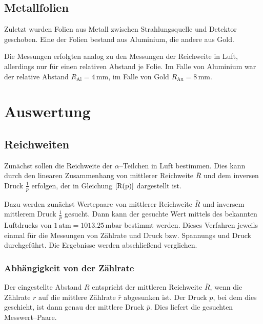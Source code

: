 \documentclass[12pt,a4paper]{scrartcl}
\numberwithin{equation}{section} %
\begin{document}
\hypertarget{metallfolien}{%
\subsection{Metallfolien}\label{metallfolien}}

Zuletzt wurden Folien aus Metall zwischen Strahlungsquelle und Detektor geschoben. Eine der Folien bestand aus Aluminium, die andere aus Gold.

Die Messungen erfolgten analog zu den Messungen der Reichweite in Luft, allerdings nur für einen relativen Abstand je Folie. Im Falle von Aluminium war der relative Abstand $R_\mathrm{Al}=4\mathrm{\,mm}$, im Falle von Gold $R_\mathrm{Au}=8\mathrm{\,mm}$.

\hypertarget{auswertung}{%
\section{Auswertung}\label{auswertung}}

\hypertarget{reichweiten}{%
\subsection{Reichweiten}\label{reichweiten}}

Zunächst sollen die Reichweite der $\alpha$--Teilchen in Luft bestimmen. Dies kann durch den linearen Zusammenhang von mittlerer Reichweite $\bar R$ und dem inversen Druck $\frac{1}{p}$ erfolgen, der in Gleichung $\eqref{R(p)}$ dargestellt ist.

Dazu werden zunächst Wertepaare von mittlerer Reichweite $\bar{R}$ und inversem mittlerem Druck $\frac{1}{\bar{p}}$ gesucht. Dann kann der gesuchte Wert mittels des bekannten Luftdrucks von $1 \mathrm{\,atm} = 1013.25 \mathrm{\,mbar}$ bestimmt werden. Dieses Verfahren jeweils einmal für die Messungen von Zählrate und Druck bzw. Spannungs und Druck durchgeführt. Die Ergebnisse werden abschließend verglichen.

\hypertarget{bestimmung-durch-zuxe4hlraten}{%
\subsubsection{Abhängigkeit von der Zählrate}\label{bestimmung-durch-zuxe4hlraten}}

Der eingestellte Abstand $R$ entspricht der mittleren Reichweite $\bar{R}$, wenn die Zählrate $r$ auf die mittlere Zählrate $\bar{r}$ abgesunken ist. Der Druck $p$, bei dem dies geschieht, ist dann genau der mittlere Druck $\bar{p}$. Dies liefert die gesuchten Messwert--Paare.
\end{document}
